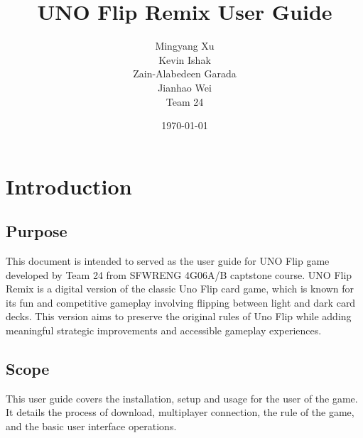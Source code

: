 \documentclass[12pt, titlepage]{article}
\begin{document}
\title{UNO Flip Remix User Guide}
\author{Mingyang Xu\\ Kevin Ishak\\ Zain-Alabedeen Garada\\ Jianhao Wei\\ Team 24}

\date{\today}

\maketitle


\tableofcontents

\listoffigures


\newpage


\section{Introduction}
\subsection{Purpose}
This document is intended to served as the user guide for UNO Flip game developed by Team 24 from SFWRENG 4G06A/B captstone course. UNO Flip Remix is a digital version of the classic Uno Flip card game, which is known for its fun and competitive gameplay involving flipping between light and dark card decks. This version aims to preserve the original rules of Uno Flip while adding meaningful strategic improvements and accessible gameplay experiences.

\subsection{Scope}
This user guide covers the installation, setup and usage for the user of the game. It details the process of download, multiplayer connection, the rule of the game, and the basic user interface operations.
\end{document}
